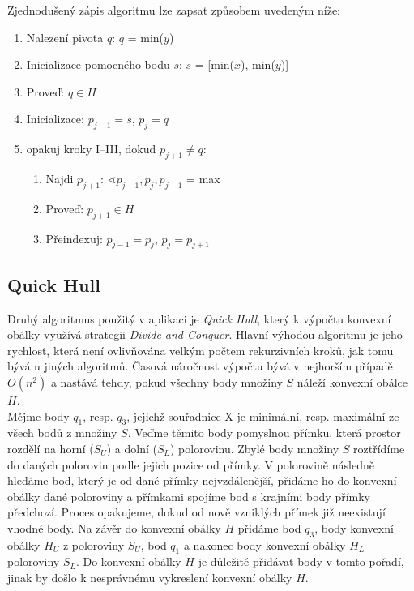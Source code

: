 \documentclass[a4paper, 12pt]{article}
\begin{document}
Zjednodušený zápis algoritmu lze zapsat způsobem uvedeným níže:

\begin{enumerate}
\item Nalezení pivota $q$: $q$ = min($y$) 
\item Inicializace pomocného bodu $s$: $s$ = [min($x$), min($y$)]
\item Proveď: $q \in H$
\item Inicializace: $p_{j-1} = s$, $p_j = q$
\item opakuj kroky I–III, dokud $p_{j+1} \neq q$:
\begin{enumerate}[label=\Roman*.]
\item 	Najdi $p_{j+1}$: $\sphericalangle p_{j-1}, p_j, p_{j+1}$ = max
\item 	Proveď: $p_{j+1} \in H$
\item 	Přeindexuj: $p_{j-1} = p_j$, $p_j = p_{j+1}$
\end{enumerate}
\end{enumerate}

\subsection{Quick Hull}
Druhý algoritmus použitý v aplikaci je \textit{Quick Hull}, který k výpočtu konvexní obálky využívá strategii \textit{Divide and Conquer}. Hlavní výhodou algoritmu je jeho rychlost, která není ovlivňována velkým počtem rekurzivních kroků, jak tomu bývá u jiných algoritmů. Časová náročnost výpočtu bývá v nejhorším případě $O(n^2)$ a nastává tehdy, pokud všechny body množiny $S$ náleží konvexní obálce $H$.\\

Mějme body $q_1$, resp. $q_3$, jejichž souřadnice X je minimální, resp. maximální ze všech bodů z množiny $S$. Veďme těmito body pomyslnou přímku, která prostor rozdělí na horní ($S_U$) a dolní ($S_L$) polorovinu. Zbylé body množiny $S$ roztřídíme do daných polorovin podle jejich pozice od přímky. V polorovině následně hledáme bod, který je od dané přímky nejvzdálenější, přidáme ho do konvexní obálky dané poloroviny a přímkami spojíme bod s krajními body přímky předchozí. Proces opakujeme, dokud od nově vzniklých přímek již neexistují vhodné body. Na závěr do konvexní obálky $H$ přidáme bod $q_3$, body konvexní obálky $H_U$ z poloroviny $S_U$, bod $q_1$ a nakonec body konvexní obálky $H_L$ poloroviny $S_L$. Do konvexní obálky $H$ je důležité přidávat body v tomto pořadí, jinak by došlo k nesprávnému vykreslení konvexní obálky $H$. \\
\end{document}
